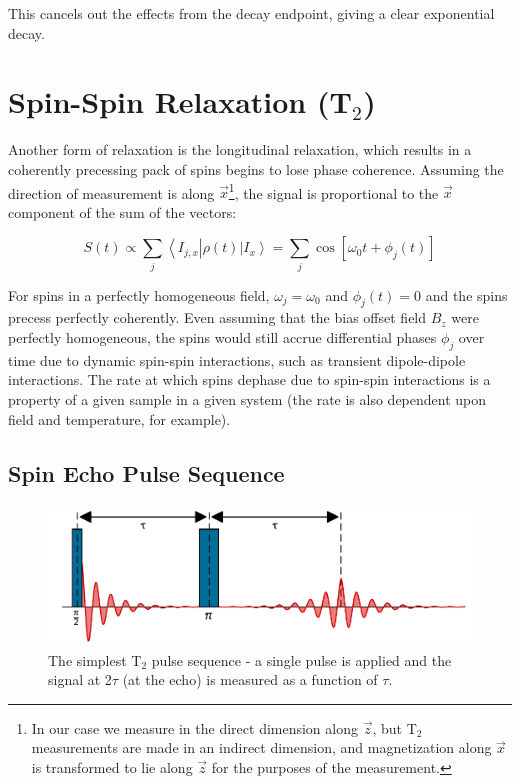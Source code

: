 \documentclass[PaulGanssle-Thesis.tex]{subfiles}
\begin{document}
This cancels out the effects from the decay endpoint, giving a clear exponential decay.

\section{Spin-Spin Relaxation (T$_2$)}
\label{Section:Relaxometry-T2}
Another form of relaxation is the longitudinal relaxation, which results in a coherently precessing pack of spins begins to lose phase coherence. Assuming the direction of measurement is along $\vec{x}$\footnote{In our case we measure in the direct dimension along $\vec{z}$, but T$_2$ measurements are made in an indirect dimension, and magnetization along $\vec{x}$ is transformed to lie along $\vec{z}$ for the purposes of the measurement.}, the signal is proportional to the $\vec{x}$ component of the sum of the vectors:

\begin{equation}
\label{eqn:SpinProportionality}
S(t) \propto \sum_{j}\left\langle I_{j,x}\right|\rho(t)\left|I_{x}\right\rangle = \sum_{j}\cos\left[\omega_{0}t + \phi_{j}(t)\right]
\end{equation}

For spins in a perfectly homogeneous field, $\omega_{j} = \omega_{0}$ and $\phi_{j}(t) = 0$ and the spins precess perfectly coherently. Even assuming that the bias offset field $B_{z}$ were perfectly homogeneous, the spins would still accrue differential phases $\phi_{j}$ over time due to dynamic spin-spin interactions, such as transient dipole-dipole interactions. The rate at which spins dephase due to spin-spin interactions is a property of a given sample in a given system (the rate is also dependent upon field and temperature, for example). 

\subsection{Spin Echo Pulse Sequence}
\label{Section-Relaxometry-T2-SpinEchoPulseSequence}
\begin{figure}[ht!]
\centering
\includegraphics[width=0.9\tw]{figures/relaxometry/SingleEchoT2.pdf}
\caption{The simplest T$_2$ pulse sequence - a single pulse is applied and the signal at 2$\tau$ (at the echo) is measured as a function of $\tau$.}
\label{fig:SpinEchoSequence}
\end{figure}
\end{document}
